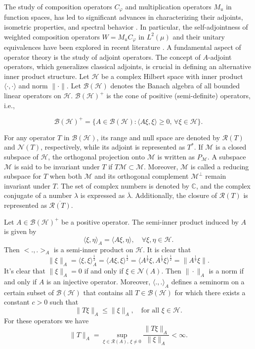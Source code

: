 \documentclass{amsart}
\theoremstyle{definition}\newtheorem{defn}[thm]{Definition}
\theoremstyle{remark}
\numberwithin{equation}{section}
\begin{document}
The study of composition operators \( C_{\varphi} \) and multiplication operators  \( M_u \) in function spaces, has led to significant advances in characterizing their adjoints, isometric properties, and spectral behavior \cite{Hedenmalm2000,DurenSchuster2004,Zhu2005,tak}. In particular, the self-adjointness of weighted composition operators \( W = M_u C_{\varphi} \) in \( L^2(\mu) \) and their unitary equivalences have been explored in recent literature \cite{Cowen1995}.
A fundamental aspect of operator theory is the study of adjoint operators. The concept of \( A \)-adjoint operators, which generalizes classical adjoints, is crucial in defining an alternative inner product structure. Let \( \mathcal{H} \) be a complex Hilbert space with inner product $\langle \cdot , \cdot \rangle$ and norm $\|\cdot\|$. Let $\mathcal{B}(\mathcal{H})$ denotes   the Banach algebra of all bounded linear operators on $\mathcal{H}$. $\mathcal{B}(\mathcal{H})^{+}$ is the cone of positive (semi-definite) operators, i.e.,

\[
\mathcal{B}(\mathcal{H})^{+} = \{A \in \mathcal{B}(\mathcal{H}) : \langle A\xi , \xi \rangle \geq 0, \, \forall \xi \in \mathcal{H} \}.
\]


For any operator $T$ in $\mathcal{B}(\mathcal{H})$, its range and null space are denoted by $\mathcal{R}(T)$ and $\mathcal{N}(T)$, respectively, while its adjoint is represented as $T^*$. If $\mathcal{M}$ is a closed subspace of $\mathcal{H}$, the orthogonal projection onto $\mathcal{M}$ is written as $P_{\mathcal{M}}$. A subspace $\mathcal{M}$ is said to be invariant under $T$ if $T\mathcal{M} \subset \mathcal{M}$. Moreover, $\mathcal{M}$ is called a reducing subspace for $T$ when both $\mathcal{M}$ and its orthogonal complement $\mathcal{M}^{\perp}$ remain invariant under $T$. The set of complex numbers is denoted by $\mathbb{C}$, and the complex conjugate of a number $\lambda$ is expressed as $\overline{\lambda}$. Additionally, the closure of $\mathcal{R}(T)$ is represented as $\overline{\mathcal{R}(T)}$.


Let \( A \in \mathcal{B}(\mathcal{H})^{+} \) be a positive operator. The semi-inner product induced by \( A \) is given by
\[
\langle \xi, \eta \rangle_A = \langle A\xi, \eta \rangle, \quad \forall \xi, \eta \in \mathcal{H}.
\]
Then $< ., . >_A$ is a semi-inner product on $\mathcal{H}$. It is clear that
\[
\|\xi\|_A = \langle \xi, \xi \rangle_A^{\frac{1}{2}} = \langle A\xi, \xi \rangle^{\frac{1}{2}} = \langle A^{\frac{1}{2}} \xi, A^{\frac{1}{2}} \xi \rangle^{\frac{1}{2}} = \|A^{\frac{1}{2}} \xi\|.
\]
It's clear that $\|\xi\|_A = 0$ if and only if $\xi \in \mathcal{N}(A)$. Then $\|\cdot\|_A$ is a norm if and only if $A$ is an injective operator. Moreover, $\langle ., . \rangle_A$ defines a seminorm on a certain subset of $\mathcal{B}(\mathcal{H})$ that contains all $T \in \mathcal{B}(\mathcal{H})$ for which there exists a constant $c > 0$ such that
\[
\|T\xi\|_A \leq \|\xi\|_A, \quad \text{for all } \xi \in \mathcal{H}.
\]
For these operators we have
\[
\|T\|_A = \sup_{\xi \in \mathcal{R}(A), \, \xi \neq 0} \frac{\|T\xi\|_A}{\|\xi\|_A} < \infty.
\]
\end{document}
